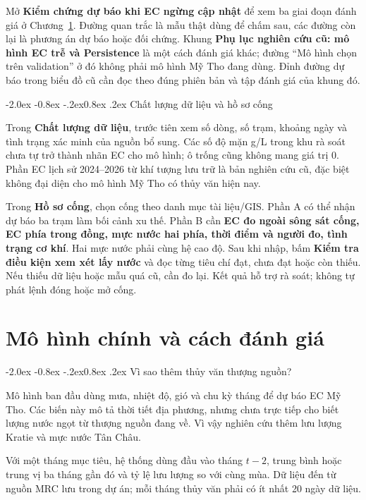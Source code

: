 \documentclass[12pt,a4paper,oneside]{report}
\makeatletter
\renewcommand\section{\@startsection{section}{1}{\z@}%
  {-2.0ex \@plus -0.8ex \@minus -.2ex}{0.8ex \@plus .2ex}%
  {\normalfont\large\bfseries\color{mainteal}}}
\makeatother
\begin{document}
Mở \textbf{Kiểm chứng dự báo khi EC ngừng cập nhật} để xem ba giai đoạn đánh giá ở Chương~\ref{chap:model}. Đường quan trắc là mẫu thật dùng để chấm sau, các đường còn lại là phương án dự báo hoặc đối chứng. Khung \textbf{Phụ lục nghiên cứu cũ: mô hình EC trễ và Persistence} là một cách đánh giá khác; đường ``Mô hình chọn trên validation'' ở đó không phải mô hình Mỹ Tho đang dùng. Đỉnh đường dự báo trong biểu đồ cũ cần đọc theo đúng phiên bản và tập đánh giá của khung đó.

\section{Chất lượng dữ liệu và hồ sơ cống}

Trong \textbf{Chất lượng dữ liệu}, trước tiên xem số dòng, số trạm, khoảng ngày và tình trạng xác minh của nguồn bổ sung. Các số độ mặn g/L trong khu rà soát chưa tự trở thành nhãn EC cho mô hình; ô trống cũng không mang giá trị 0. Phần EC lịch sử 2024--2026 từ khí tượng lưu trữ là bản nghiên cứu cũ, đặc biệt không đại diện cho mô hình Mỹ Tho có thủy văn hiện nay.

Trong \textbf{Hồ sơ cống}, chọn cống theo danh mục tài liệu/GIS. Phần A có thể nhận dự báo ba trạm làm bối cảnh xu thế. Phần B cần \textbf{EC đo ngoài sông sát cống, EC phía trong đồng, mực nước hai phía, thời điểm và người đo, tình trạng cơ khí}. Hai mực nước phải cùng hệ cao độ. Sau khi nhập, bấm \textbf{Kiểm tra điều kiện xem xét lấy nước} và đọc từng tiêu chí đạt, chưa đạt hoặc còn thiếu. Nếu thiếu dữ liệu hoặc mẫu quá cũ, cần đo lại. Kết quả hỗ trợ rà soát; không tự phát lệnh đóng hoặc mở cống.

\chapter{Mô hình chính và cách đánh giá}\label{chap:model}

\section{Vì sao thêm thủy văn thượng nguồn?}

Mô hình ban đầu dùng mưa, nhiệt độ, gió và chu kỳ tháng để dự báo EC Mỹ Tho. Các biến này mô tả thời tiết địa phương, nhưng chưa trực tiếp cho biết lượng nước ngọt từ thượng nguồn đang về. Vì vậy nghiên cứu thêm lưu lượng Kratie và mực nước Tân Châu.

Với một tháng mục tiêu, hệ thống dùng đầu vào tháng $t-2$, trung bình hoặc trung vị ba tháng gần đó và tỷ lệ lưu lượng so với cùng mùa. Dữ liệu đến từ nguồn MRC lưu trong dự án; mỗi tháng thủy văn phải có ít nhất 20 ngày dữ liệu.
\end{document}
